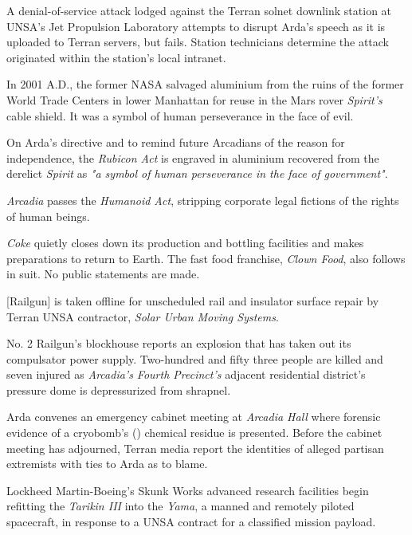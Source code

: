 A denial-of-service attack lodged against the Terran solnet downlink station at UNSA's Jet Propulsion Laboratory attempts to disrupt Arda's speech as it is uploaded to Terran servers, but fails. Station technicians determine the attack originated within the station's local intranet.
\StopTimelineDate

In 2001 A.D., the former NASA salvaged aluminium from the ruins of the former World Trade Centers in lower Manhattan for reuse in the Mars rover {\it Spirit's} cable shield. It was a symbol of human perseverance in the face of evil. 

On Arda's directive and to remind future Arcadians of the reason for independence, the {\it Rubicon Act} is engraved in aluminium recovered from the derelict {\it Spirit} as {\it "a symbol of human perseverance in the face of government"}.
\StopTimelineDate

{\it Arcadia} passes the {\it Humanoid Act}, stripping corporate legal fictions of the rights of human beings.
\StopTimelineDate

{\it Coke} quietly closes down its production and bottling facilities and makes preparations to return to Earth. The fast food franchise, {\it Clown Food}, also follows in suit. No public statements are made.
\StopTimelineDate


[Railgun] is taken offline for unscheduled rail and insulator surface repair by Terran UNSA contractor, {\it Solar Urban Moving Systems}.
\StopTimelineDate

No. \type{#}2 Railgun's blockhouse reports an explosion that has taken out its compulsator power supply. Two-hundred and fifty three people are killed and seven injured as {\it Arcadia's Fourth Precinct's} adjacent residential district's pressure dome is depressurized from shrapnel.

Arda convenes an emergency cabinet meeting at {\it Arcadia Hall} where forensic evidence of a cryobomb's () chemical residue is presented. Before the cabinet meeting has adjourned, Terran media report the identities of alleged partisan extremists with ties to Arda as to blame.
\StopTimelineDate

Lockheed Martin-Boeing's Skunk Works advanced research facilities begin refitting the {\it Tarikin III} into the {\it Yama}, a manned and remotely piloted spacecraft, in response to a UNSA contract for a classified mission payload.
\StopTimelineDate


